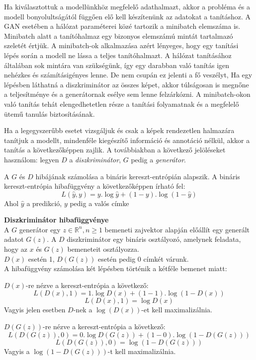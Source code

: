 Ha kiválasztottuk a modellünkhöz megfelelő adathalmazt, akkor a probléma és a modell bonyolultságától függően elő kell készítenünk az adatokat a tanításhoz.
A GAN esetében a hálózat paraméterei közé tartozik a minibatch elemszáma is. Minibatch alatt a tanítóhalmaz egy bizonyos elemszámú mintát tartalmazó szeletét értjük. A minibatch-ok alkalmazása azért lényeges, hogy egy tanítási lépés során a modell ne lássa a teljes tanítóhalmazt. A hálózat tanításához általában sok mintára van szükségünk, így egy darabban való tanítás igen nehézkes és számításigényes lenne. De nem csupán ez jelenti a fő veszélyt, Ha egy lépésben láthatná a diszkriminátor az összes képet, akkor túlságosan is megnőne a teljesítménye és a generátornak esélye sem lenne felzárkózni. A minibatch-okon való tanítás tehát elengedhetetlen része a tanítási folyamatnak és a megfelelő ütemű tanulás biztosításának.

Ha a legegyszerűbb esetet vizsgáljuk és csak a képek rendezetlen halmazára tanítjuk a modellt, mindenféle kiegészítő információ és annotáció nélkül, akkor a tanítás a következőképpen zajlik.
A továbbiakban a következő jelöléseket használom: legyen $D$ a \textit{diszkriminátor}, $G$ pedig a \textit{generátor}.

A $G$ és $D$ hibájának számolása a bináris kereszt-entrópián alapszik.
A bináris kereszt-entrópia hibafüggvény a következőképpen írható fel:
$$L(\hat y, y) = y . \log \hat y + (1-y). \log (1 - \hat y)$$
Ahol $\hat y$ a predikció, $y$ pedig a valós címke

\noindent \textbf{Diszkriminátor hibafüggvénye}\\
A $G$ generátor egy $z \in \mathbb{R}^n, n \geq 1$ bemeneti zajvektor alapján előállít egy generált adatot $G(z)$.
A $D$ diszkriminátor egy bináris osztályozó, amelynek feladata, hogy az $x$ és $G(z)$ bemeneteit osztályozza.\\
$D(x)$ esetén 1, $D(G(z))$ esetén pedig 0 címkét várunk.\\
A hibafüggvény számolása két lépésben történik a kétféle bemenet miatt:

$D(x)$-re nézve a kereszt-entrópia a következő:
$$L(D(x), 1) = 1.\log D(x) + (1 - 1).\log(1 - D(x))$$
$$L(D(x), 1) = \log D(x)$$
Vagyis jelen esetben $D$-nek a $\log(D(x))$-et kell maximalizálnia.

$D(G(z))$-re nézve a kereszt-entrópia a következő:
$$L(D(G(z)), 0) = 0.\log D(G(z)) + (1 - 0).\log(1 - D(G(z)))$$
$$L(D(G(z)), 0) = \log(1- D(G(z)))$$
Vagyis a $\log(1 - D(G(z)))$-t kell maximalizálnia.


